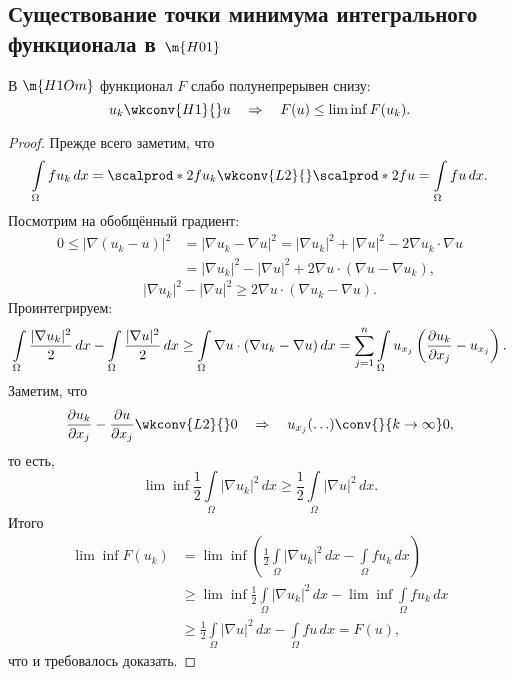 \subsection{Существование точки минимума интегрального функционала в $\m{H01}$}
\begin{lemma} В $\m{H1Om}$ функционал $F$ слабо полунепрерывен снизу:
$$u_k \wkconv{H1}{} u \quad \Rightarrow \quad F(u) \leq \lim \inf F(u_k).$$
\end{lemma}
\begin{proof} Прежде всего заметим, что
$$ \int \limits_\Omega f u_k \, dx = \scalprod*{2}{f}{u_k} \wkconv{L2}{} \scalprod*{2}{f}{u} =\int \limits_\Omega f u \, dx.$$
Посмотрим на обобщённый градиент:
\begin{align*}
0 \leq | \nabla (u_k - u) |^2 &= | \nabla u_k - \nabla u |^2 = |\nabla u_k|^2 + |\nabla u|^2 - 2 \nabla u_k \cdot \nabla u \\
&= |\nabla u_k|^2 - |\nabla u|^2 + 2 \nabla u \cdot (\nabla u - \nabla u_k),
\end{align*}
$$ |\nabla u_k|^2 - |\nabla u|^2 \geq 2 \nabla u \cdot (\nabla u_k - \nabla u).$$
Проинтегрируем:
$$ \int \limits_\Omega \frac {| \nabla u_k|^2} {2} \, dx - \int \limits_\Omega \frac {| \nabla u|^2} {2} \, dx \geq \int \limits_\Omega \nabla u \cdot (\nabla u_k - \nabla u) \, dx = \sum_{j=1}^n \int \limits_\Omega u_{x_j} \left( \pder[u_k]{x_j} - u_{x_j} \right) .$$
Заметим, что
$$ \pder[u_k]{x_j} - \pder[u]{x_j} \wkconv{L2}{} 0 \quad \Rightarrow \quad u_{x_j} (\hdots) \conv{}{k \to \infty} 0,$$
то есть,
$$ \lim \inf \frac {1} {2} \int \limits_\Omega |\nabla u_k|^2 \, dx \geq \frac {1} {2} \int \limits_\Omega |\nabla u|^2 \, dx.$$
Итого
\begin{align*}
\lim \inf F(u_k) &= \lim \inf \left( \frac {1}{2} \int \limits_\Omega |\nabla u_k|^2 \, dx - \int \limits_\Omega fu_k \, dx \right) \\
&\geq \lim \inf \frac {1} {2} \int \limits_\Omega |\nabla u_k|^2 \, dx - \lim \inf \int \limits_\Omega fu_k \, dx \\
&\geq \frac {1} {2} \int \limits_\Omega |\nabla u|^2 \, dx - \int \limits_\Omega fu \, dx = F(u),
\end{align*}
что и требовалось доказать.

\end{proof}

